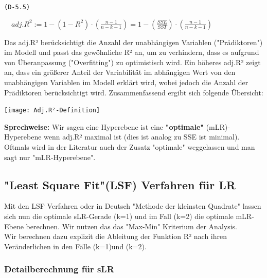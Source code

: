 \documentclass[12pt]{article}
\begin{document}
\begin{center}
\texttt{(D-5.5)}
\begin{large}
\textbf{$ \quad adj.R^2 := 1 - (1 - R^2) \cdot (\frac{n-1}{n-k-1}) = 1 - (\frac{SSE}{SST}) \cdot (\frac{n-1}{n-k-1}) $}  \\[0.6cm] 
\end{large}     
\end{center}
%
Das adj.R² berücksichtigt die Anzahl der unabhängigen Variablen ("Prädiktoren") im Modell und passt das gewöhnliche R² an, um zu verhindern, dass es aufgrund von Überanpassung ("Overfitting") zu optimistisch wird. Ein höheres adj.R² zeigt an, dass ein größerer Anteil der Variabilität im abhängigen Wert von den unabhängigen Variablen im Modell erklärt wird, wobei jedoch die Anzahl der Prädiktoren berücksichtigt wird. Zusammenfassend ergibt sich folgende Übersicht:\\

\begin{center}
\texttt{[image: Adj.R²-Definition]}\\
\end{center}
%
\textbf{Sprechweise:} Wir sagen eine Hyperebene ist eine \textbf{"optimale"} (mLR)- Hyperebene wenn adj.R² maximal ist (dies ist analog zu SSE ist minimal). Oftmals wird in der Literatur auch der Zusatz "optimale" weggelassen und man sagt nur "mLR-Hyperebene".\\ 




\subsection{"Least Square Fit"(LSF) Verfahren für LR}

Mit den LSF Verfahren oder in Deutsch "Methode der kleinsten Quadrate" lassen sich nun die optimale sLR-Gerade (k=1) und im Fall (k=2) die optimale mLR-Ebene berechnen. Wir nutzen das das "Max-Min" Kriterium der Analysis.\\
Wir berechnen dazu explizit die Ableitung der Funktion R² nach ihren Veränderlichen in den Fälle (k=1)und (k=2). 

\subsubsection{Detailberechnung für sLR}
\end{document}
